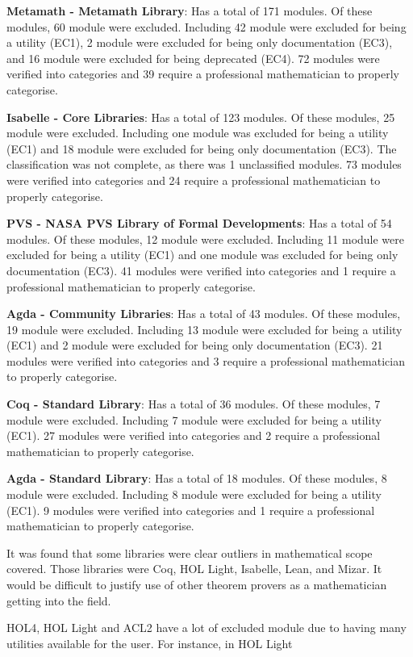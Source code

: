 \documentclass[
]{article}
\begin{document}
\textbf{Metamath - Metamath Library}: Has a total of 171 modules. Of
these modules, 60 module were excluded. Including 42 module were
excluded for being a utility (EC1), 2 module were excluded for being
only documentation (EC3), and 16 module were excluded for being
deprecated (EC4). 72 modules were verified into categories and 39
require a professional mathematician to properly categorise.

\textbf{Isabelle - Core Libraries}: Has a total of 123 modules. Of these
modules, 25 module were excluded. Including one module was excluded for
being a utility (EC1) and 18 module were excluded for being only
documentation (EC3). The classification was not complete, as there was 1
unclassified modules. 73 modules were verified into categories and 24
require a professional mathematician to properly categorise.

\textbf{PVS - NASA PVS Library of Formal Developments}: Has a total of
54 modules. Of these modules, 12 module were excluded. Including 11
module were excluded for being a utility (EC1) and one module was
excluded for being only documentation (EC3). 41 modules were verified
into categories and 1 require a professional mathematician to properly
categorise.

\textbf{Agda - Community Libraries}: Has a total of 43 modules. Of these
modules, 19 module were excluded. Including 13 module were excluded for
being a utility (EC1) and 2 module were excluded for being only
documentation (EC3). 21 modules were verified into categories and 3
require a professional mathematician to properly categorise.

\textbf{Coq - Standard Library}: Has a total of 36 modules. Of these
modules, 7 module were excluded. Including 7 module were excluded for
being a utility (EC1). 27 modules were verified into categories and 2
require a professional mathematician to properly categorise.

\textbf{Agda - Standard Library}: Has a total of 18 modules. Of these
modules, 8 module were excluded. Including 8 module were excluded for
being a utility (EC1). 9 modules were verified into categories and 1
require a professional mathematician to properly categorise.

It was found that some libraries were clear outliers in mathematical
scope covered. Those libraries were Coq, HOL Light, Isabelle, Lean, and
Mizar. It would be difficult to justify use of other theorem provers as
a mathematician getting into the field.

HOL4, HOL Light and ACL2 have a lot of excluded module due to having
many utilities available for the user. For instance, in HOL Light
\end{document}
